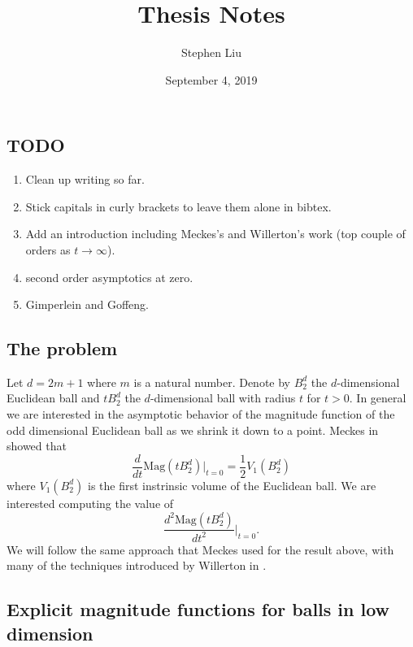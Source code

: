 \documentclass[11pt]{article}
\theoremstyle{definition}
\theoremstyle{definition}
\theoremstyle{plain}
\theoremstyle{plain}
\theoremstyle{plain}
\theoremstyle{definition}
\begin{document}
\author{Stephen Liu}
\title{Thesis Notes}
\date{September 4, 2019}

\maketitle

\subsection*{TODO}
\begin{enumerate}
\item Clean up writing so far.
\item Stick capitals in curly brackets to leave them alone in bibtex.
\item Add an introduction including Meckes's and Willerton's work (top couple of orders as $t\to\infty$).
\item second order asymptotics at zero.
\item Gimperlein and Goffeng.
\end{enumerate}

\subsection*{The problem}

Let $d = 2m+1$ where $m$ is a natural number. Denote by $B_2^d$ the $d$-dimensional Euclidean ball and $tB_2^d$ the $d$-dimensional ball with radius $t$ for $t > 0$. In general we are interested in the asymptotic behavior of the magnitude function of the odd dimensional Euclidean ball as we shrink it down to a point. Meckes in \cite{meckes_magnitude_2019} showed that
\begin{equation*}
\frac{d}{dt}\text{Mag}(tB_2^d)\big\vert_{t=0} = \frac{1}{2}V_1(B_2^d)
\end{equation*}
where $V_1(B_2^d)$ is the first instrinsic volume of the Euclidean ball.
We are interested computing the value of
\begin{equation*}
\frac{d^2\text{Mag}(tB_2^d)}{dt^2}\big\vert_{t=0}.
\end{equation*}
We will follow the same approach that Meckes used for the result above, with many of the techniques introduced by Willerton in \cite{willerton_magnitude_2017}.

\subsection*{Explicit magnitude functions for balls in low dimension}
\end{document}
